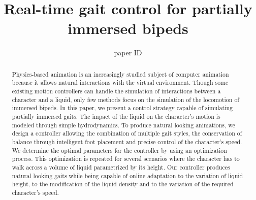 \documentclass[conference]{acmsiggraph}
\title{Real-time gait control for partially immersed bipeds}
\author{paper ID}
\begin{document}

\maketitle

\begin{abstract}

Physics-based animation is an increasingly studied subject of computer animation because it allows natural interactions with the virtual environment. Though some existing motion controllers can handle the simulation of interactions between a character and a liquid, only few methods focus on the simulation of the locomotion of immersed bipeds. In this paper, we present a control strategy capable of simulating partially immersed gaits. The impact of the liquid on the character's motion is modeled through simple hydrodynamics. To produce natural looking animations, we design a controller allowing the combination of multiple gait styles, the conservation of balance through intelligent foot placement and precise control of the character's speed. We determine the optimal parameters for the controller by using an optimization process. This optimization is repeated for several scenarios where the character has to walk across a volume of liquid parametrized by its height. Our controller produces natural looking gaits while being capable of online adaptation to the variation of liquid height, to the modification of the liquid density and to the variation of the required character's speed.

\end{abstract}
\end{document}
